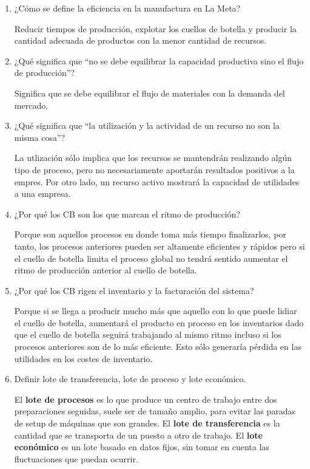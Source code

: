 \documentclass[12pt, letterpaper]{article}
\begin{document}
\begin{enumerate}
	\item ¿Cómo se define la eficiencia en la manufactura en La Meta?

		Reducir tiempos de producción, explotar los cuellos de botella y producir la cantidad adecuada de productos con la menor cantidad de recursos.

	\item ¿Qué significa que “no se debe equilibrar la capacidad productiva sino el flujo de producción”?

		Significa que se debe equilibrar el flujo de materiales con la demanda del mercado.

	\item ¿Qué significa que “la utilización y la actividad de un recurso no son la misma cosa”?

		La utlización sólo implica que los recursos se mantendrán realizando algún tipo de proceso, pero no necesariamente aportarán resultados positivos a la empres. Por otro lado, un recurso activo mostrará la capacidad de utilidades a una empresa.

	\item ¿Por qué los CB son los que marcan el ritmo de producción?

		Porque son aquellos procesos en donde toma más tiempo finalizarlos, por tanto, los procesos anteriores pueden ser altamente eficientes y rápidos pero si el cuello de botella limita el proceso global no tendrá sentido aumentar el ritmo de producción anterior al cuello de botella.

	\item ¿Por qué los CB rigen el inventario y la facturación del sistema?

		Porque si se llega a producir mucho más que aquello con lo que puede lidiar el cuello de botella, aumentará el producto en proceso en los inventarios dado que el cuello de botella seguirá trabajando al mismo ritmo incluso si los procesos anteriores son de lo más eficiente. Esto sólo generaría pérdida en las utilidades en los costes de inventario.

	\item Definir lote de transferencia, lote de proceso y lote económico.

		El \textbf{lote de procesos} es lo que produce un centro de trabajo entre dos preparaciones seguidas, suele ser de tamaño amplio, para evitar las paradas de setup de máquinas que son grandes. El \textbf{lote de transferencia} es la cantidad que se transporta de un puesto a otro de trabajo. El \textbf{lote económico} es un lote basado en datos fijos, sin tomar en cuenta las fluctuaciones que puedan ocurrir. 


\end{enumerate}
\end{document}
